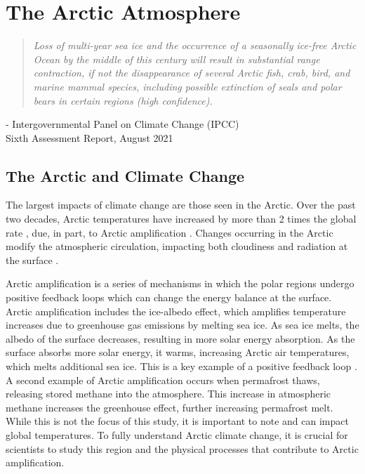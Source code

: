 \chapter{The Arctic Atmosphere}
\vspace{1 cm}
\begin{spacing}{1} \begin{quote} 
\noindent \emph{Loss of multi-year sea ice and the occurrence of a seasonally ice-free Arctic Ocean by the middle of this century will result in substantial range contraction, if not the disappearance of several Arctic fish, crab, bird, and marine mammal species, including possible extinction of seals and polar bears in certain regions (high confidence).} \end{quote}
\hspace{6 cm} - Intergovernmental Panel on Climate Change (IPCC) \\
\hspace*{6.7 cm} Sixth Assessment Report, August 2021  
\end{spacing}
\doublespacing
\section{The Arctic and Climate Change}
The largest impacts of climate change are those seen in the Arctic. Over the past two decades, Arctic temperatures have increased by more than 2 times the global rate \citep{IPCC:14}, due, in part, to Arctic amplification \citep{rantanen:2022}. Changes occurring in the Arctic modify the atmospheric circulation, impacting both cloudiness and radiation at the surface \citep{zhang:2008}.
 
Arctic amplification is a series of mechanisms in which the polar regions undergo positive feedback loops which can change the energy balance at the surface. Arctic amplification includes the ice-albedo effect, which amplifies temperature increases due to greenhouse gas emissions by melting sea ice. As sea ice melts, the albedo of the surface decreases, resulting in more solar energy absorption. As the surface absorbs more solar energy, it warms, increasing Arctic air temperatures, which melts additional sea ice. This is a key example of a positive feedback loop \citep{ipcc_techsum}. A second example of Arctic amplification occurs when permafrost thaws, releasing stored methane into the atmosphere. This increase in atmospheric methane increases the greenhouse effect, further increasing permafrost melt. While this is not the focus of this study, it is important to note and can impact global temperatures. To fully understand Arctic climate change, it is crucial for scientists to study this region and the physical processes that contribute to Arctic amplification.

